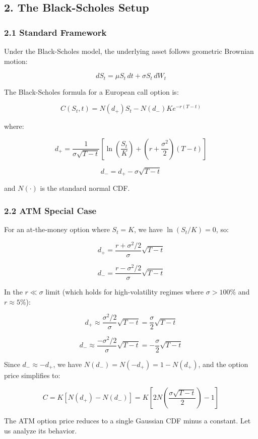 \documentclass[
  11pt,
  openany]{article}
\begin{document}
\subsection{2. The Black-Scholes Setup}\label{the-black-scholes-setup}

\subsubsection{2.1 Standard Framework}\label{standard-framework}

Under the Black-Scholes model, the underlying asset follows geometric
Brownian motion:

\[dS_t = \mu S_t \, dt + \sigma S_t \, dW_t\]

The Black-Scholes formula for a European call option is:

\[C(S_t, t) = N(d_+) S_t - N(d_-) K e^{-r(T-t)}\]

where:

\[d_+ = \frac{1}{\sigma\sqrt{T-t}}\left[\ln\left(\frac{S_t}{K}\right) + \left(r + \frac{\sigma^2}{2}\right)(T-t)\right]\]

\[d_- = d_+ - \sigma\sqrt{T-t}\]

and \(N(\cdot)\) is the standard normal CDF.

\subsubsection{2.2 ATM Special Case}\label{atm-special-case}

For an at-the-money option where \(S_t = K\), we have
\(\ln(S_t/K) = 0\), so:

\[d_+ = \frac{r + \sigma^2/2}{\sigma}\sqrt{T-t}\]

\[d_- = \frac{r - \sigma^2/2}{\sigma}\sqrt{T-t}\]

In the \(r \ll \sigma\) limit (which holds for high-volatility regimes
where \(\sigma > 100\%\) and \(r \approx 5\%\)):

\[d_+ \approx \frac{\sigma^2/2}{\sigma}\sqrt{T-t} = \frac{\sigma}{2}\sqrt{T-t}\]

\[d_- \approx \frac{-\sigma^2/2}{\sigma}\sqrt{T-t} = -\frac{\sigma}{2}\sqrt{T-t}\]

Since \(d_- \approx -d_+\), we have \(N(d_-) = N(-d_+) = 1 - N(d_+)\),
and the option price simplifies to:

\[C = K\left[N(d_+) - N(d_-)\right] = K\left[2N\left(\frac{\sigma\sqrt{T-t}}{2}\right) - 1\right]\]

The ATM option price reduces to a single Gaussian CDF minus a constant.
Let us analyze its behavior.
\end{document}
